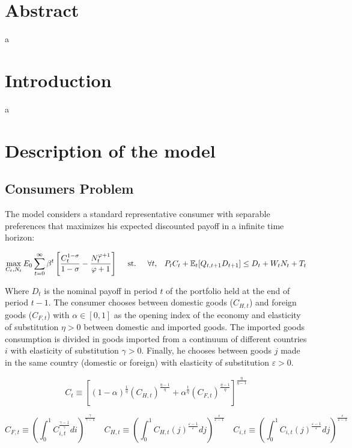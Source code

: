 \documentclass{article}
\newcommand{\Et}{\mathbb{E}_t}
\begin{document}
\section*{Abstract}
a

\section{Introduction}
a

\section{Description of the model}

\subsection{Consumers Problem}
The model considers a standard representative consumer with separable preferences that maximizes his expected discounted payoff in a infinite time horizon:

\begin{equation}
    \max_{C_t, N_t} E_0 \sum^\infty_{t=0} \beta^t \left[\frac{C_t^{1-\sigma}}{1-\sigma} - \frac{N_t^{\varphi+1}}{\varphi+1} \right] \hspace{1em}  \textrm{ st. } \hspace{1em} \forall t, \hspace{0.8em} P_t C_t + \Et[Q_{t,t+1} D_{t+1}] \leq D_t +  W_t N_t + T_t
\end{equation}

Where $D_t$ is the nominal payoff in period $t$ of the portfolio held at the end of period $t-1$. The consumer chooses between domestic goods ($C_{H,t}$) and foreign goods ($C_{F,t}$) with $\alpha \in [0,1]$ as the opening index of the economy and elasticity of substitution $\eta > 0$ between domestic and imported goods. The imported goods consumption is divided in goods imported from a continuum of different countries $i$ with elasticity of substitution $\gamma > 0$. Finally, he chooses between goods $j$ made in the same country (domestic or foreign) with elasticity of substitution $\varepsilon > 0$.

\begin{equation}
    C_t \equiv \left[ (1-\alpha)^{\frac{1}{\eta}} (C_{H,t})^{\frac{\eta-1}{\eta}} + \alpha^{\frac{1}{\eta}} (C_{F,t})^{\frac{\eta-1}{\eta}} \right]^{\frac{\eta}{\eta-1}}
\end{equation}

\begin{equation*}
    C_{F,t} \equiv \left( \int^1_0 C_{i,t}^{\frac{\gamma-1}{\gamma}} di \right)^{\frac{\gamma}{\gamma-1}} \quad C_{H,t} \equiv \left( \int^1_0 C_{H,t}(j)^{\frac{\varepsilon-1}{\varepsilon}} dj \right)^{\frac{\varepsilon}{\varepsilon-1}} \quad C_{i,t} \equiv \left( \int^1_0 C_{i,t}(j)^{\frac{\varepsilon-1}{\varepsilon}} dj \right)^{\frac{\varepsilon}{\varepsilon-1}}
\end{equation*}
\end{document}

